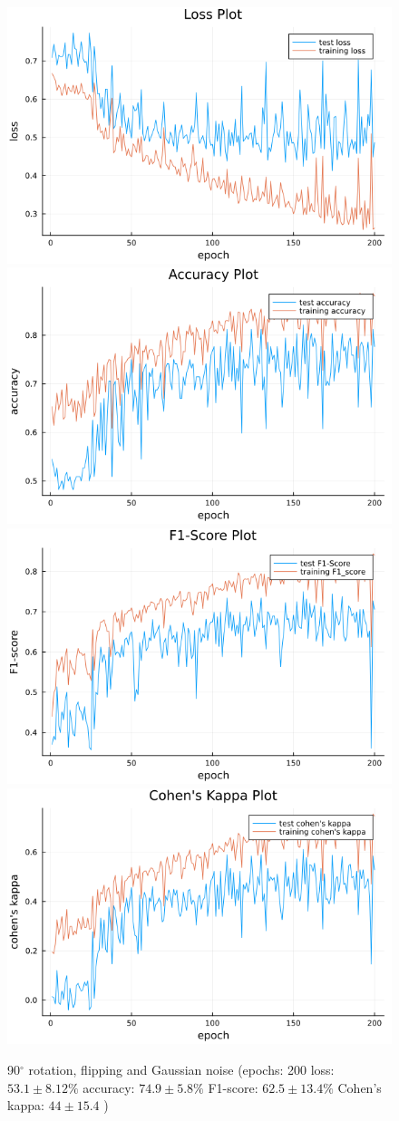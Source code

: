\documentclass[
a4paper, 
12pt,
grayscalebody, %
abstract=on,
twoside, BCOR10mm, 12pt, DIV13,headinclude, footexclude, final, abstracton, openright
]{ibireprt}
\numberwithin{equation}{chapter}
\numberwithin{table}{chapter}
\numberwithin{figure}{chapter}
\numberwithin{algorithm}{chapter}
\numberwithin{example}{chapter}
\numberwithin{example}{chapter}
\begin{document}
\begin{figure}
	\includegraphics[width=0.4\linewidth]{loss_png_final_run_0_7.png}\hfill
	\includegraphics[width=0.4\linewidth]{accuracy_png_final_run_0_7.png}
	\\[\smallskipamount]
	\includegraphics[width=0.4\linewidth]{f1_score_png_final_run_0_7.png}\hfill
	\includegraphics[width=0.4\linewidth]{cohens_kappa_png_final_run_0_7.png}
	\caption{90$^{\circ}$ rotation, flipping and Gaussian noise (epochs: 200 loss: $53.1\pm8.12\% $ accuracy: $74.9\pm5.8\%$ F1-score: $62.5\pm13.4\%$  Cohen's kappa: $44\pm15.4$ )}
\end{figure}%
\end{document}
